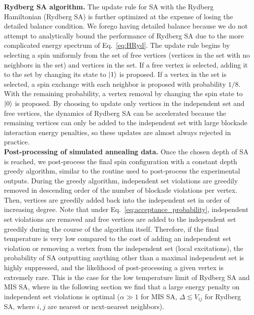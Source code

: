 \documentclass[twocolumn,amssymb,secnumarabic, prl, aps, nofootinbib]{revtex4-1}
\begin{document}
\noindent\textbf{Rydberg SA algorithm.} The update rule for SA with the Rydberg Hamiltonian (Rydberg SA) is further optimized at the expense of losing the detailed balance condition. We forego having detailed balance because we do not attempt to analytically bound the performance of Rydberg SA 
due to the more complicated energy spectrum of Eq.~\ref{eq:HRyd}.
The update rule begins by selecting a spin uniformly from the set of free vertices (vertices in the set with no neighbors in the set) and vertices in the set. If a free vertex is selected, adding it to the set by changing its state to $\ket{1}$ is proposed. If a vertex in the set is selected, a spin exchange with each neighbor is proposed with probability $1/8$. With the remaining probability, a vertex removal by changing the spin state to $\ket{0}$ is proposed. By choosing to update only vertices in the independent set and free vertices, the dynamics of Rydberg SA can be accelerated because the remaining vertices can only be added to the independent set with large blockade interaction energy penalties, so these updates are almost always rejected in practice. \\


\noindent\textbf{Post-processing of simulated annealing data.} Once the chosen depth of SA is reached, we post-process the final spin configuration with a constant depth greedy algorithm, similar to the routine used to post-process the experimental outputs. During the greedy algorithm, independent set violations are greedily removed in descending order of the number of blockade violations per vertex. Then, vertices are greedily added back into the independent set in order of increasing degree.  Note that under Eq.~\eqref{eq:acceptance_probability}, independent set violations are removed and free vertices are added to the independent set greedily
during the course of the algorithm itself. Therefore, if the final temperature is very low compared to the cost of adding an independent set violation or removing a vertex from the independent set (local excitations), the probability of SA outputting anything other than a maximal independent set is highly suppressed, and the likelihood of post-processing a given vertex is extremely rare. This is the case for the low temperature limit of Rydberg SA and MIS SA, where in the following section we find that a large energy penalty on independent set violations is optimal ($\alpha \gg 1$ for MIS SA, $\Delta\lesssim V_{ij}$  for Rydberg SA, where $i, j$ are nearest or next-nearest neighbors). 
\end{document}
